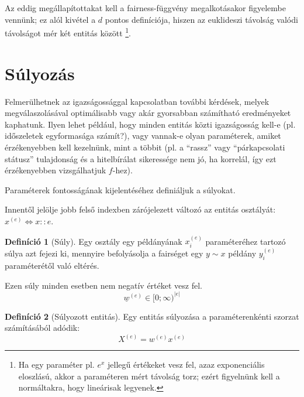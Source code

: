 \documentclass{article}
\theoremstyle{definition}
\newtheorem{definition}{Definíció}[section]
\newcommand{\vect}[1]{ \underline{#1} }
\newcommand{\ent}[2]{ {#1}^{(#2)} }
\begin{document}
\begin{multicols}{2}
    Az eddig megállapítottakat kell a fairness-függvény megalkotásakor figyelembe vennünk; ez alól kivétel a $d$ pontos definíciója, hiszen az euklideszi távolság valódi távolságot mér két entitás között \footnote{Ha egy paraméter pl. $e^x$ jellegű értékeket vesz fel, azaz exponenciális eloszlású, akkor a paraméteren mért távolság torz; ezért figyelnünk kell a normáltakra, hogy lineárisak legyenek.}.
    

\section{Súlyozás}
    Felmerülhetnek az igazságossággal kapcsolatban további kérdések, melyek megválaszolásával optimálisabb vagy akár gyorsabban számítható eredményeket kaphatunk. Ilyen lehet például, hogy minden entitás közti igazságosság kell-e (pl. időszeletek egyformasága számít?), vagy vannak-e olyan paraméterek, amiket érzékenyebben kell kezelnünk, mint a többit (pl. a \enquote{rassz} vagy \enquote{párkapcsolati státusz} tulajdonság és a hitelbírálat sikeressége nem jó, ha korrelál, így ezt érzékenyebben vizsgálhatjuk $f$-hez).
    
    Paraméterek fontosságának kijelentéséhez definiáljuk a súlyokat.
    
    Innentől jelölje jobb felső indexben zárójelezett változó az entitás osztályát: $x^{(e)} \Leftrightarrow x::e$.
    
    \begin{definition}[Súly]
        Egy osztály egy példányának $\ent{x}{e}_i$ paraméteréhez tartozó súlya azt fejezi ki, mennyire befolyásolja a fairséget egy $y\sim x$ példány $\ent{y}{e}_i$ paraméterétől való eltérés. 
        
        Ezen súly minden esetben nem negatív értéket vesz fel.
        \begin{equation}
            \ent{\vect w}{e} \in [0;\infty)^{|e|}
        \end{equation}
    \end{definition}
    
    \begin{definition}[Súlyozott entitás]
        Egy entitás súlyozása a paraméterenkénti szorzat számításából adódik:
        \begin{equation}
            \ent X e = \ent w e \ent x e
        \end{equation}
    \end{definition}
    

\end{multicols}
\end{document}
